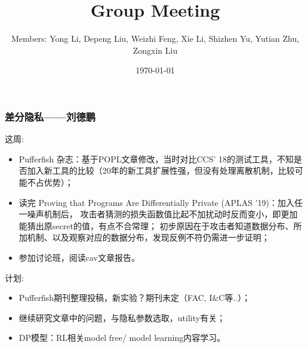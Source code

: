 \documentclass[aspectratio=1610, 13pt]{beamer}
\title{Group Meeting}
\date{\today}
\author{Members: Yong Li, Depeng Liu, Weizhi Feng, Xie Li, Shizhen Yu, Yutian Zhu, Zongxin Liu}
\begin{document}
\maketitle

\begin{frame}\frametitle{差分隐私——刘德鹏}
这周:
\begin{itemize}
  \item Pufferfish 杂志：基于POPL文章修改，当时对比CCS' 18的测试工具，不知是否加入新工具的比较（20年的新工具扩展性强，但没有处理离散机制，比较可能不占优势）；
  \item 读完 Proving that Programs Are Differentially Private (APLAS '19)：加入任一噪声机制后，
  攻击者猜测的损失函数值比起不加扰动时反而变小，即更加能猜出原secret的值，有点不合常理；
  初步原因在于攻击者知道数据分布、所加机制、以及观察对应的数据分布，发现反例不符仍需进一步证明；
  \item 参加讨论班，阅读cav文章报告。
\end{itemize}

计划:
\begin{itemize}
  \item Pufferfish期刊整理投稿，新实验？期刊未定（FAC, I\&C等..）；
  \item 继续研究文章中的问题，与隐私参数选取，utility有关；
  \item DP模型：RL相关model free/ model learning内容学习。
\end{itemize}
\end{frame}
\end{document}
